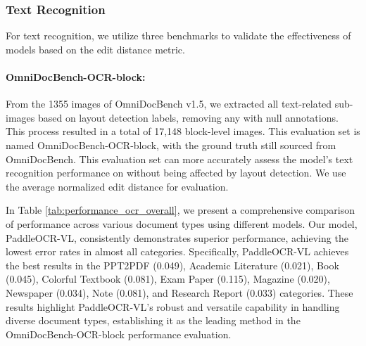 \documentclass[11pt, a4paper,logo,  copyright, nonumbering]{paddleocr}
\begin{document}
\subsubsection{Text Recognition} 

For text recognition, we utilize three benchmarks to validate the effectiveness of models based on the edit distance metric. 

\paragraph{OmniDocBench-OCR-block:} From the 1355 images of OmniDocBench v1.5, we extracted all text-related sub-images based on layout detection labels, removing any with null annotations. This process resulted in a total of 17,148 block-level images. This evaluation set is named OmniDocBench-OCR-block, with the ground truth still sourced from OmniDocBench. This evaluation set can more accurately assess the model’s text recognition performance on without being affected by layout detection. We use the average normalized edit distance for evaluation.
        
In Table \ref{tab:performance_ocr_overall}, we present a comprehensive comparison of performance across various document types using different models. Our model, PaddleOCR-VL, consistently demonstrates superior performance, achieving the lowest error rates in almost all categories. Specifically, PaddleOCR-VL achieves the best results in the PPT2PDF (0.049), Academic Literature (0.021), Book (0.045), Colorful Textbook (0.081), Exam Paper (0.115), Magazine (0.020), Newspaper (0.034), Note (0.081), and Research Report (0.033) categories. These results highlight PaddleOCR-VL’s robust and versatile capability in handling diverse document types, establishing it as the leading method in the OmniDocBench-OCR-block performance evaluation.
\end{document}
